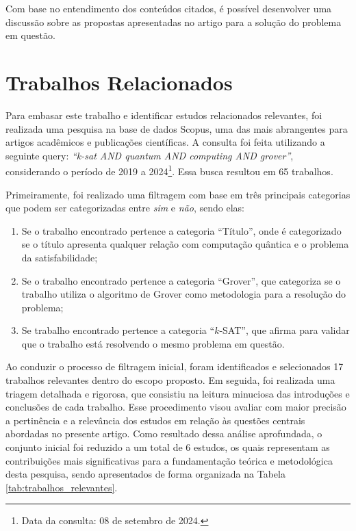 \documentclass[12pt]{article}
\begin{document}
Com base no entendimento dos conteúdos citados, é possível desenvolver uma discussão sobre as propostas apresentadas no artigo para a solução do problema em questão.

\section{Trabalhos Relacionados}\label{sec:relacionados}

Para embasar este trabalho e identificar estudos relacionados relevantes, foi realizada uma pesquisa na base de dados Scopus, uma das mais abrangentes para artigos acadêmicos e publicações científicas. A consulta foi feita utilizando a seguinte query: \textit{``k-sat AND quantum AND computing AND grover''}, considerando o período de 2019 a 2024\footnote{Data da consulta: 08 de setembro de 2024.}. Essa busca resultou em 65 trabalhos.


Primeiramente, foi realizado uma filtragem com base em três principais categorias que podem ser categorizadas entre \textit{sim} e \textit{não}, sendo elas:
\begin{enumerate}
    \item  Se o trabalho encontrado pertence a categoria ``Título'', onde é categorizado se o título apresenta qualquer relação com computação quântica e o problema da satisfabilidade;
    \item Se o  trabalho encontrado pertence a categoria ``Grover'', que categoriza se o trabalho utiliza o algoritmo de Grover como metodologia para a resolução do problema;
    \item Se trabalho encontrado pertence a categoria ``$k$-SAT'', que afirma  para validar que o trabalho está resolvendo o mesmo problema em questão.
\end{enumerate}

Ao conduzir o processo de filtragem inicial, foram identificados e selecionados 17 trabalhos relevantes dentro do escopo proposto. Em seguida, foi realizada uma triagem detalhada e rigorosa, que consistiu na leitura minuciosa das introduções e conclusões de cada trabalho. Esse procedimento visou avaliar com maior precisão a pertinência e a relevância dos estudos em relação às questões centrais abordadas no presente artigo. Como resultado dessa análise aprofundada, o conjunto inicial foi reduzido a um total de 6 estudos, os quais representam as contribuições mais significativas para a fundamentação teórica e metodológica desta pesquisa, sendo apresentados de forma organizada na Tabela \ref{tab:trabalhos_relevantes}.
\end{document}
